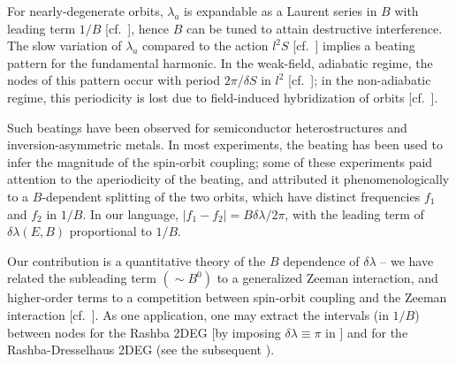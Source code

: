 \documentclass[aps, showpacs, twocolumn, notitlepage, superscriptaddress]{revtex4-1}
\begin{document}

For nearly-degenerate orbits, $\lambda_a$ is expandable as a Laurent series in $B$ with leading term $1/B$ [cf.\ ], hence $B$ can be tuned to attain destructive interference. The slow variation of $\lambda_a$ compared to the action $l^2S$ [cf.\ ] implies a beating pattern for the fundamental harmonic. In the weak-field, adiabatic regime, the nodes of this pattern occur with period $2\pi/\delta S$ in $l^2$ [cf.\ ]; in the non-adiabatic regime, this periodicity is lost due to field-induced hybridization of orbits [cf.\ ]. 

Such beatings have been observed for semiconductor heterostructures\cite{das_evidence_1989,hu_zero-field_1999,wilde_inversion-asymmetry-induced_2009} and inversion-asymmetric metals\cite{terashima_fermi_2008,onuki_chiral-structure-driven_2014,maurya_splitting_2018}. In most experiments, the beating has been used to infer the magnitude of the spin-orbit coupling\cite{das_evidence_1989,onuki_chiral-structure-driven_2014,maurya_splitting_2018}; some of these experiments\cite{das_evidence_1989} paid attention to  the aperiodicity of the beating, and attributed it phenomenologically to a $B$-dependent splitting of the two orbits, which have distinct frequencies $f_1$ and $f_2$ in $1/B$. In our language, $|f_1-f_2|=B\delta\lambda/2\pi$, with the leading term of $\delta \lambda(E,B)$ proportional to $1/B$.

Our contribution is a quantitative theory of the $B$ dependence of $\delta\lambda$ -- we have related the subleading term  $({\sim}B^0)$ to a generalized Zeeman interaction, and higher-order terms to a competition between spin-orbit coupling and the Zeeman interaction [cf.\ ]. As one application, one may extract the intervals (in $1/B$) between nodes for the Rashba 2DEG [by imposing $\delta \lambda{\equiv}\pi$ in ] and for the Rashba-Dresselhaus 2DEG (see the subsequent ).

\end{document}
